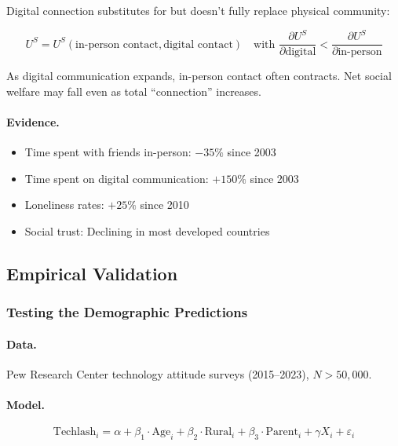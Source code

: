 Digital connection substitutes for but doesn't fully replace physical community:

\begin{equation}
U^S = U^S(\text{in-person contact}, \text{digital contact}) \quad \text{with } \frac{\partial U^S}{\partial \text{digital}} < \frac{\partial U^S}{\partial \text{in-person}}
\end{equation}

As digital communication expands, in-person contact often contracts. 
Net social welfare may fall even as total ``connection'' increases.

\paragraph{Evidence.}
\begin{itemize}
    \item Time spent with friends in-person: $-35\%$ since 2003
    \item Time spent on digital communication: $+150\%$ since 2003
    \item Loneliness rates: $+25\%$ since 2010
    \item Social trust: Declining in most developed countries
\end{itemize}

\subsection{Empirical Validation}

\subsubsection{Testing the Demographic Predictions}

\paragraph{Data.}
Pew Research Center technology attitude surveys (2015--2023), $N > 50,000$.

\paragraph{Model.}
\begin{equation}
\text{Techlash}_i = \alpha + \beta_1 \cdot \text{Age}_i + \beta_2 \cdot \text{Rural}_i + \beta_3 \cdot \text{Parent}_i + \gamma X_i + \varepsilon_i
\end{equation}

